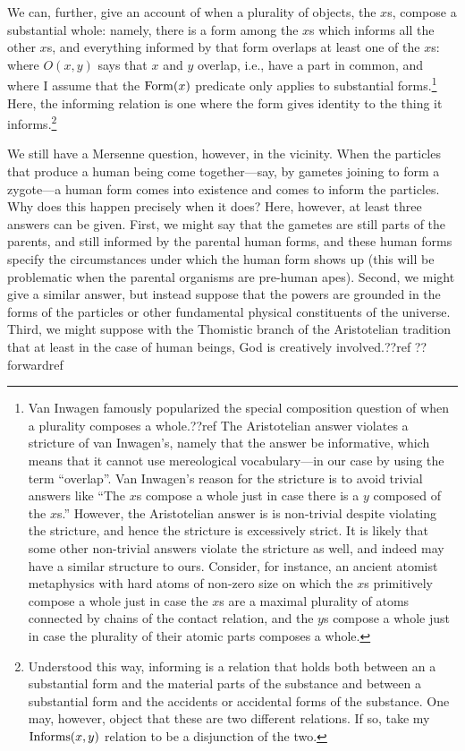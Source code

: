 We can, further, give an account of when a plurality of objects, the $x$s, compose a 
substantial whole: namely, there is a form among the $x$s which informs all the other $x$s, 
and everything informed by that form overlaps at least one of the $x$s:
where $O(x,y)$ says that $x$ and $y$ overlap, i.e., have a part in common, and where I assume
that the $\operatorname{Form}(x)$ predicate only applies to substantial forms.\footnote{Van Inwagen famously popularized the special composition question of when a plurality
composes a whole.??ref The Aristotelian answer violates a stricture of van Inwagen's, namely that the answer be informative,
which means that it cannot use mereological vocabulary---in our case by using the term ``overlap''. Van Inwagen's reason for 
the stricture is to avoid trivial answers like ``The $x$s compose a whole just in case there is a $y$ composed of the $x$s.'' 
However, the Aristotelian answer is is non-trivial despite violating the stricture, and hence the stricture is 
excessively strict. It is likely that some other non-trivial answers violate the stricture as well, and indeed may have a similar structure to ours. Consider, for instance, an ancient atomist metaphysics with hard atoms of non-zero size 
on which the $x$s primitively compose a whole just in case the $x$s are a maximal plurality of atoms connected by chains of 
the contact relation, and the $y$s compose a whole just in case the plurality of their atomic parts composes a whole.}
Here, the informing relation is one where the form gives identity to the thing it informs.\footnote{Understood this way, informing is a relation that holds both between an a substantial 
form and the material parts of the substance and between a substantial form and the accidents or 
accidental forms of the substance. One may, however, object that these are two different relations.
If so, take my $\operatorname{Informs}(x,y)$ relation to be a disjunction of the two.}

We still have a Mersenne question, however, in the vicinity. When the particles that 
produce a human being come together---say, by gametes joining to form a zygote---a human form comes into existence
and comes to inform the particles. Why does this happen precisely when it does? Here, however, at least three answers
can be given. First, we might say that the gametes are still parts of the parents, and still informed by the
parental human forms, and these human forms specify the circumstances under which the human form shows up (this
will be problematic when the parental organisms are pre-human apes). Second, 
we might give a similar answer, but instead suppose that the powers
are grounded in the forms of the particles or other fundamental physical constituents of the universe.
Third, we might suppose with the Thomistic branch of the Aristotelian tradition that at least in the case of human
beings, God is creatively involved.??ref  ??forwardref

